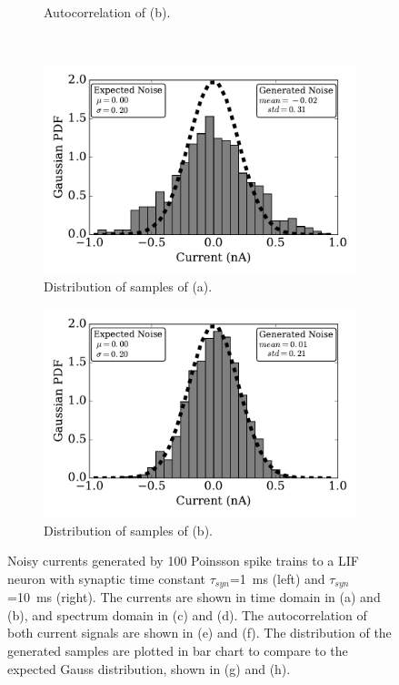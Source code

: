 \documentclass[runningheads,a4paper]{llncs}
\begin{document}
\begin{figure}[tbp!]
\begin{subfigure}[t]{0.43\textwidth}
		\caption{Autocorrelation of (b).}
	\end{subfigure}\\
	\begin{subfigure}[t]{0.43\textwidth}
		\includegraphics[width=\textwidth]{distr_tau1.pdf}
		\caption{Distribution of samples of (a).}
	\end{subfigure}
	\begin{subfigure}[t]{0.43\textwidth}
		\includegraphics[width=\textwidth]{distr_tau10.pdf}
		\caption{Distribution of samples of (b).}
	\end{subfigure}
	\caption{Noisy currents generated by 100 Poinsson spike trains to a LIF neuron with synaptic time constant $\tau_{syn}$=1~ms (left) and $\tau_{syn}$=10~ms (right). The currents are shown in time domain in (a) and (b), and spectrum domain in (c) and (d). The autocorrelation of both current signals are shown in (e) and (f). The distribution of the generated samples are plotted in bar chart to compare to the expected Gauss distribution, shown in (g) and (h).}
	\label{Fig:lif_pois}
\end{figure}
\end{document}
